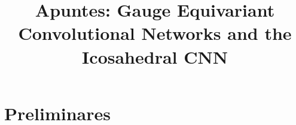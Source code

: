 \documentclass[a4paper]{report}
\title{Apuntes: Gauge Equivariant Convolutional Networks and the Icosahedral CNN}
\author{}
\date{}
\begin{document}
    \maketitle
    \tableofcontents

	\chapter{Preliminares}
	\setcounter{section}{0}


	
	
	

\end{document}
